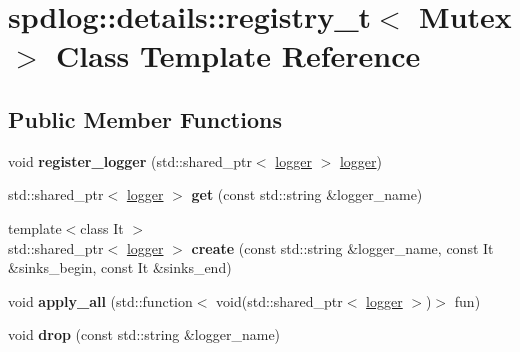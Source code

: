 \hypertarget{classspdlog_1_1details_1_1registry__t}{}\section{spdlog\+:\+:details\+:\+:registry\+\_\+t$<$ Mutex $>$ Class Template Reference}
\label{classspdlog_1_1details_1_1registry__t}
\subsection*{Public Member Functions}
\begin{DoxyCompactItemize}
\item 
void {\bfseries register\+\_\+logger} (std\+::shared\+\_\+ptr$<$ \hyperlink{classspdlog_1_1logger}{logger} $>$ \hyperlink{classspdlog_1_1logger}{logger})\hypertarget{classspdlog_1_1details_1_1registry__t_a75c112598c85eeadce7eaa2babe42f6a}{}\label{classspdlog_1_1details_1_1registry__t_a75c112598c85eeadce7eaa2babe42f6a}

\item 
std\+::shared\+\_\+ptr$<$ \hyperlink{classspdlog_1_1logger}{logger} $>$ {\bfseries get} (const std\+::string \&logger\+\_\+name)\hypertarget{classspdlog_1_1details_1_1registry__t_a83c60ec97a96497a28b29ec042e54103}{}\label{classspdlog_1_1details_1_1registry__t_a83c60ec97a96497a28b29ec042e54103}

\item 
{\footnotesize template$<$class It $>$ }\\std\+::shared\+\_\+ptr$<$ \hyperlink{classspdlog_1_1logger}{logger} $>$ {\bfseries create} (const std\+::string \&logger\+\_\+name, const It \&sinks\+\_\+begin, const It \&sinks\+\_\+end)\hypertarget{classspdlog_1_1details_1_1registry__t_a001d70ea4b0a4794dc4ffe2cdf720d22}{}\label{classspdlog_1_1details_1_1registry__t_a001d70ea4b0a4794dc4ffe2cdf720d22}

\item 
void {\bfseries apply\+\_\+all} (std\+::function$<$ void(std\+::shared\+\_\+ptr$<$ \hyperlink{classspdlog_1_1logger}{logger} $>$)$>$ fun)\hypertarget{classspdlog_1_1details_1_1registry__t_a6a75f3d36f7c54268512c586f4eb37af}{}\label{classspdlog_1_1details_1_1registry__t_a6a75f3d36f7c54268512c586f4eb37af}

\item 
void {\bfseries drop} (const std\+::string \&logger\+\_\+name)\hypertarget{classspdlog_1_1details_1_1registry__t_a547ea68afabdf2be39e20fa5aadbc37c}{}\label{classspdlog_1_1details_1_1registry__t_a547ea68afabdf2be39e20fa5aadbc37c}


\end{DoxyCompactItemize}
